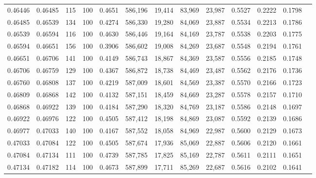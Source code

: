 \begin{tabular}{rrrrrrrrrrrrr}
0.46446 & 0.46485 &   115 & 100 &                                     0.4651 & 586,196 &  19,414 &  83,969 &  23,987 & 0.5527 & 0.2222 & 0.1798 \\
0.46485 & 0.46539 &   134 & 100 &                                     0.4274 & 586,330 &  19,280 &  84,069 &  23,887 & 0.5534 & 0.2213 & 0.1786 \\
0.46539 & 0.46594 &   116 & 100 &                                     0.4630 & 586,446 &  19,164 &  84,169 &  23,787 & 0.5538 & 0.2203 & 0.1775 \\
0.46594 & 0.46651 &   156 & 100 &                                     0.3906 & 586,602 &  19,008 &  84,269 &  23,687 & 0.5548 & 0.2194 & 0.1761 \\
0.46651 & 0.46706 &   141 & 100 &                                     0.4149 & 586,743 &  18,867 &  84,369 &  23,587 & 0.5556 & 0.2185 & 0.1748 \\
0.46706 & 0.46759 &   129 & 100 &                                     0.4367 & 586,872 &  18,738 &  84,469 &  23,487 & 0.5562 & 0.2176 & 0.1736 \\
0.46760 & 0.46808 &   137 & 100 &                                     0.4219 & 587,009 &  18,601 &  84,569 &  23,387 & 0.5570 & 0.2166 & 0.1723 \\
0.46809 & 0.46868 &   142 & 100 &                                     0.4132 & 587,151 &  18,459 &  84,669 &  23,287 & 0.5578 & 0.2157 & 0.1710 \\
0.46868 & 0.46922 &   139 & 100 &                                     0.4184 & 587,290 &  18,320 &  84,769 &  23,187 & 0.5586 & 0.2148 & 0.1697 \\
0.46922 & 0.46976 &   122 & 100 &                                     0.4505 & 587,412 &  18,198 &  84,869 &  23,087 & 0.5592 & 0.2139 & 0.1686 \\
0.46977 & 0.47033 &   140 & 100 &                                     0.4167 & 587,552 &  18,058 &  84,969 &  22,987 & 0.5600 & 0.2129 & 0.1673 \\
0.47033 & 0.47084 &   122 & 100 &                                     0.4505 & 587,674 &  17,936 &  85,069 &  22,887 & 0.5606 & 0.2120 & 0.1661 \\
0.47084 & 0.47134 &   111 & 100 &                                     0.4739 & 587,785 &  17,825 &  85,169 &  22,787 & 0.5611 & 0.2111 & 0.1651 \\
0.47134 & 0.47182 &   114 & 100 &                                     0.4673 & 587,899 &  17,711 &  85,269 &  22,687 & 0.5616 & 0.2102 & 0.1641 \\

\end{tabular}
